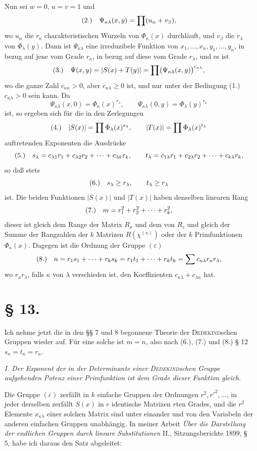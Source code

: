 \documentclass[11pt]{article}
\newcommand{\eps}{\varepsilon}
\newcommand{\fnum}[1]{\textup{(\ensuremath{#1}.)}\quad}
\begin{document}
Nun sei $w=0$, $u=v=1$ und
\[
\fnum{2} \Psi_{\kappa\lambda}(x,y)=\prod(u_\alpha+v_\beta),
\]
wo $u_\alpha$ die $r_\kappa$ charakteristischen Wurzeln von $\Phi_\kappa(x)$ durchläuft, und $v_\beta$ die $r_\lambda$ von $\Phi_\lambda(y)$. Dann ist $\Psi_{\kappa\lambda}$ eine irreduzibele Funktion von $x_1,\ldots,x_n,y_1,\ldots,y_n$, in bezug auf jene vom Grade $r_\kappa$, in bezug auf diese vom Grade $r_\lambda$, und es ist
\[
\fnum{3} \Psi(x,y)=|S(x)+T(y)|=\prod\bigl(\Psi_{\kappa\lambda}(x,y)\bigr)^{c_{\kappa\lambda}},
\]
wo die ganze Zahl $c_{\kappa\kappa}>0$, aber $c_{\kappa\lambda}\geq0$ ist, und nur unter der Bedingung (1.) $c_{\kappa\lambda}>0$ sein kann. Da
\[
 \Psi_{\kappa\lambda}(x,0)=\Phi_\kappa(x)^{r_\lambda},
 \qquad
 \Psi_{\kappa\lambda}(0,y)=\Phi_\lambda(y)^{r_\kappa}
\]
ist, so ergeben sich für die in den Zerlegungen
\[
\fnum{4} |S(x)|=\prod\Phi_\lambda(x)^{s_\lambda},
\qquad
|T(x)|=\prod\Phi_\lambda(x)^{t_\lambda}
\]
auftretenden Exponenten die Ausdrücke
\[
\fnum{5} s_\lambda=c_{\lambda1}r_1+c_{\lambda2}r_2+\cdots+c_{\lambda k}r_k,
\qquad
 t_\lambda=c_{1\lambda}r_1+c_{2\lambda}r_2+\cdots+c_{k\lambda}r_k,
\]
so daß stets
\[
\fnum{6} s_\lambda\geq r_\lambda,
\qquad t_\lambda\geq r_\lambda
\]
ist. Die beiden Funktionen $|S(x)|$ und $|T(x)|$ haben denselben linearen Rang
\[
\fnum{7} m=r_1^2+r_2^2+\cdots+r_k^2,
\]
dieser ist gleich dem Range der Matrix $R_\sigma$ und dem von $R_\tau$ und gleich der Summe der Rangzahlen der $k$ Matrizen $R(\chi^{(\kappa)})$ oder der $k$ Primfunktionen $\Phi_\kappa(x)$. Dagegen ist die Ordnung der Gruppe $(\eps)$
\[
\fnum{8} n=r_1s_1+\cdots+r_ks_k=r_1t_1+\cdots+r_kt_k=\sum c_{\kappa\lambda}r_\kappa r_\lambda,
\]
wo $r_\kappa r_\lambda$, falls $\kappa$ von $\lambda$ verschieden ist, den Koeffizienten $c_{\kappa\lambda}+c_{\lambda\kappa}$ hat.

\section*{§ 13.}

Ich nehme jetzt die in den §§ 7 und 8 begonnene Theorie der \textsc{Dedekind}schen Gruppen wieder auf. Für eine solche ist $m=n$, also nach (6.), (7.) und (8.) § 12 $s_\kappa=t_\kappa=r_\kappa$.

\emph{I. Der Exponent der in der Determinante einer \textsc{Dedekind}schen Gruppe aufgehenden Potenz einer Primfunktion ist dem Grade dieser Funktion gleich.}

Die Gruppe $(\eps)$ zerfällt in $k$ einfache Gruppen der Ordnungen $r^2,r'^2,\ldots$, in jeder derselben zerfällt $S(x)$ in $r$ identische Matrizen $r$ten Grades, und die $r^2$ Elemente $x_{\kappa\lambda}$ einer solchen Matrix sind unter einander und von den Variabeln der anderen einfachen Gruppen unabhängig. In meiner Arbeit \emph{Über die Darstellung der endlichen Gruppen durch lineare Substitutionen} II., Sitzungsberichte 1899, § 5, habe ich daraus den Satz abgeleitet:
\end{document}

